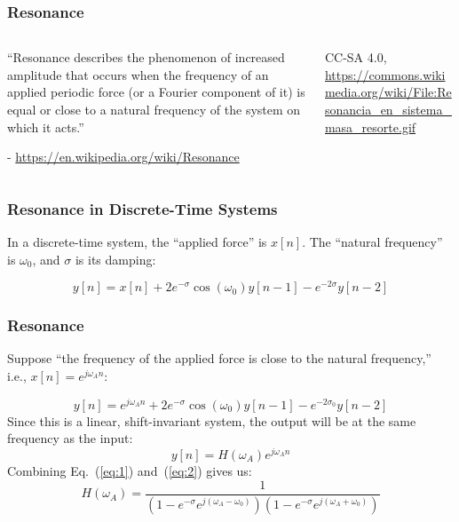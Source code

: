\documentclass{beamer}
\begin{document}
\begin{frame}
  \frametitle{Resonance}
  \begin{columns}
    \begin{column}{0.5\textwidth}
      ``Resonance describes the phenomenon of increased amplitude that
      occurs when the frequency of an applied periodic force (or a
      Fourier component of it) is equal or close to a natural
      frequency of the system on which it acts.''

      - \url{https://en.wikipedia.org/wiki/Resonance}
    \end{column}
    \begin{column}{0.5\textwidth}
      \begin{center}
        
        {\tiny CC-SA 4.0, \url{https://commons.wikimedia.org/wiki/File:Resonancia_en_sistema_masa_resorte.gif}}
      \end{center}
    \end{column}
  \end{columns}
\end{frame}

\begin{frame}
  \frametitle{Resonance in Discrete-Time Systems}

  In a discrete-time system, the ``applied force'' is $x[n]$.  The
  ``natural frequency'' is $\omega_0$, and $\sigma$ is its damping:

  \begin{displaymath}
    y[n] = x[n] + 2e^{-\sigma}\cos(\omega_0)y[n-1] - e^{-2\sigma} y[n-2]
  \end{displaymath}
\end{frame}

\begin{frame}
  \frametitle{Resonance}

  Suppose ``the frequency of the applied force is close to the natural
  frequency,'' i.e., $x[n]=e^{j\omega_A n}$:
  
  \begin{equation}
    y[n] = e^{j\omega_An} + 2e^{-\sigma}\cos(\omega_0)y[n-1] - e^{-2\sigma_0} y[n-2]
    \label{eq:1}
  \end{equation}
  Since this is a linear, shift-invariant system, the output will be
  at the same frequency as the input:
  \begin{equation}
    y[n]=H(\omega_A)e^{j\omega_A n}
    \label{eq:2}
  \end{equation}
  Combining Eq.~(\ref{eq:1}) and~(\ref{eq:2}) gives us:
  \begin{displaymath}
    H(\omega_A) = \frac{1}{\left(1-e^{-\sigma}e^{j(\omega_A-\omega_0)}\right)
      \left(1-e^{-\sigma}e^{j(\omega_A+\omega_0)}\right)}
  \end{displaymath}
\end{frame}
\end{document}
